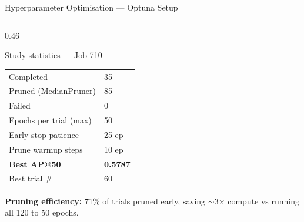 \documentclass[aspectratio=169, 10pt]{beamer}
\begin{document}
\begin{frame}{Hyperparameter Optimisation — Optuna Setup}
\begin{columns}[T]
\begin{column}{0.46\textwidth}
\begin{block}{\small Study statistics — Job 710}
\begin{tabular}{ll}
          \rowcolor{rowhl}
          Completed & 35 \\
          Pruned (MedianPruner) & 85 \\
          Failed & 0 \\
          \midrule
          Epochs per trial (max) & 50 \\
          Early-stop patience & 25 ep \\
          Prune warmup steps & 10 ep \\
          \midrule
          \rowcolor{rowhl}
          \textbf{Best AP@50} & \textbf{0.5787} \\
          Best trial \# & 60 \\
          \bottomrule
        \end{tabular}
      \end{block}

      \vspace{4pt}
      {\small\textbf{Pruning efficiency:} 71\% of trials pruned early, saving $\sim$3$\times$ compute vs running all 120 to 50 epochs.}
    \end{column}
  \end{columns}
\end{frame}
\end{document}
